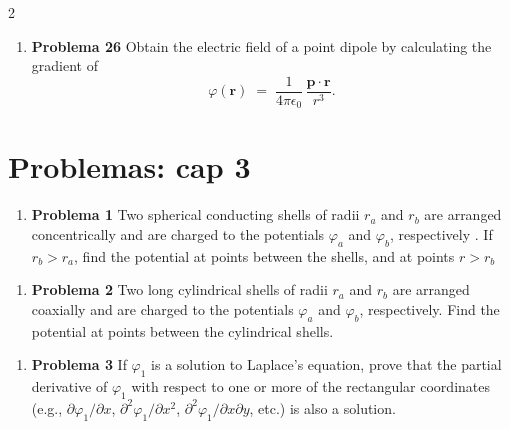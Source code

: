 \documentclass{article}
\begin{document}
\begin{multicols}{2}
\begin{enumerate}[label={{\textcolor{trueblue}{\textbf{Pr.} \arabic*.26}}}, start=2]
\item \textbf{Problema 26} \; Obtain the electric field of a point dipole by calculating the gradient of
\[
\varphi(\boldsymbol{r}) \;=\; \frac{1}{4\pi\epsilon_0}\,\frac{\boldsymbol{p}\cdot\boldsymbol{r}}{r^{3}}.
\]
\end{enumerate}




\section*{\textcolor{Cinnabar}{\textbf{Problemas: cap 3}}}

	

\begin{enumerate}[label={{\textcolor{trueblue}{\textbf{Pr.} \arabic*.1}}}, start=3]
\item \textbf{Problema 1} Two spherical conducting shells of radii $r_{a}$ and $r_{b}$ are arranged concentrically and are charged to the potentials $\varphi_{a}$ and $\varphi_{b}$, respectively . If $r_{b}>r_{a}$, find the potential at points between the shells, and at points $r>r_{b}$
\end{enumerate}

\begin{enumerate}[label={{\textcolor{trueblue}{\textbf{Pr.} \arabic*.2}}}, start=3]
\item \textbf{Problema 2} Two long cylindrical shells of radii $r_{a}$ and $r_{b}$ are arranged coaxially and are charged to the potentials $\varphi_{a}$ and $\varphi_{b}$, respectively. Find the potential at points between the cylindrical shells.
\end{enumerate}

\begin{enumerate}[label={{\textcolor{trueblue}{\textbf{Pr.} \arabic*.3}}}, start=3]
\item \textbf{Problema 3} If $\varphi_{1}$ is a solution to Laplace’s equation, prove that the partial derivative of $\varphi_{1}$ with respect to one or more of the rectangular coordinates (e.g., $\partial \varphi_{1}/\partial x$, $\partial^{2}\varphi_{1}/\partial x^{2}$, $\partial^{2}\varphi_{1}/\partial x \partial y$, etc.) is also a solution.
\end{enumerate}


\end{multicols}
\end{document}
